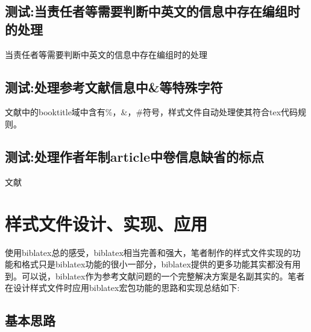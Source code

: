 \subsection{测试:当责任者等需要判断中英文的信息中存在编组时的处理}
\begin{refsection}
当责任者等需要判断中英文的信息中存在编组时的处理\cite{IFLAI1977b--,IFLAI1977--}
\cite{r27-BenHadjAlaya-FekiA.2008-1-5,中国企业投资协会2014--,中国企业投资协会2015--}

\printbibliography[heading=bibliography,title=【中英文判断信息中存在编组的测试】]
\end{refsection}



\subsection{测试:处理参考文献信息中\&等特殊字符}\label{sec:entrytype:compatibility}
\begin{refsection}
文献中\cite{ref-replace-char}的booktitle域中含有\%，\&，\#符号，样式文件自动处理使其符合tex代码规则。
\printbibliography[heading=bibliography,title=【处理参考文献信息中\&等特殊字符】]
\end{refsection}

\subsection{测试:处理作者年制article中卷信息缺省的标点}\label{sec:article:novol}
\begin{refsection}
文献\cite{刘彻东1998-38-39}\cite{亚洲地质图编目组1978-194-208}
\cite{高光明1998-60-65}

\printbibliography[heading=bibliography,title=【author-year style:article without volume】]
\end{refsection}


\section{样式文件设计、实现、应用}\label{sec:biblatex:mech}
使用biblatex总的感受，biblatex相当完善和强大，笔者制作的样式文件实现的功能和格式只是biblatex功能的很小一部分，biblatex提供的更多功能其实都没有用到。可以说，biblatex作为参考文献问题的一个完整解决方案是名副其实的。笔者在设计样式文件时应用biblatex宏包功能的思路和实现总结如下:

\subsection{基本思路}

